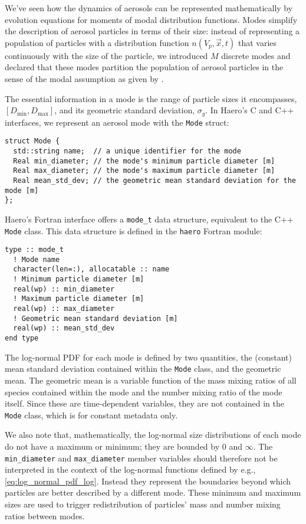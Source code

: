 We've seen how the dynamics of aerosols can be represented mathematically
by evolution equations for moments of modal distribution functions. Modes
simplify the description of aerosol particles in terms of their size: instead of
representing a population of particles with a distribution function
$n(V_p, \vec{x}, t)$ that varies continuously with the size of the particle, we
introduced $M$ discrete modes and declared that these modes partition the
population of aerosol particles in the sense of the modal assumption as given
by .

The essential information in a mode is the range of particle sizes it
encompasses, $[D_{\min}, D_{\max}]$, and its geometric standard deviation,
$\sigma_g$. In Haero's C and C++ interfaces,
we represent an aerosol mode with the \texttt{Mode} struct:

\begin{lstlisting}
struct Mode {
  std::string name;  // a unique identifier for the mode
  Real min_diameter; // the mode's minimum particle diameter [m]
  Real max_diameter; // the mode's maximum particle diameter [m]
  Real mean_std_dev; // the geometric mean standard deviation for the mode [m]
};
\end{lstlisting}

Haero's Fortran interface offers a \texttt{mode\_t} data structure, equivalent to
the C++ \texttt{Mode} class. This data structure is defined in the \texttt{haero}
Fortran module:

\begin{lstlisting}
type :: mode_t
  ! Mode name
  character(len=:), allocatable :: name
  ! Minimum particle diameter [m]
  real(wp) :: min_diameter
  ! Maximum particle diameter [m]
  real(wp) :: max_diameter
  ! Geometric mean standard deviation [m]
  real(wp) :: mean_std_dev
end type
\end{lstlisting}

The log-normal PDF for each mode is defined by two quantities, the (constant) mean standard deviation contained within the \texttt{Mode} class, and the geometric mean.
The geometric mean is a variable function of the mass mixing ratios of all species contained within the mode and the number mixing ratio of the mode itself. 
Since these are time-dependent variables, they are not contained in the \texttt{Mode} class, which is for constant metadata only.

We also note that, mathematically, the log-normal size distributions of each mode do not have a maximum or minimum; they are bounded by 0 and $\infty$.
The \texttt{min\_diameter} and \texttt{max\_diameter} member variables should therefore not be interpreted in the context of the log-normal functions defined by e.g., \eqref{eq:log_normal_pdf_log}.
Instead they represent the boundaries beyond which particles are better described by a different mode.  
These minimum and maximum sizes are used to trigger redistribution of particles' mass and number mixing ratios between modes.


